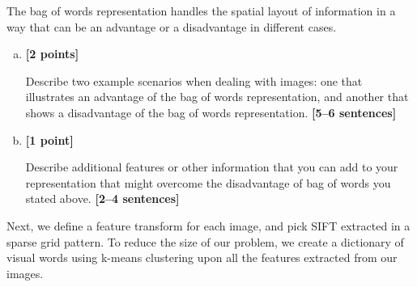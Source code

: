 The bag of words representation handles the spatial layout of information in a way that can be an advantage or a disadvantage in different cases.

\begin{enumerate}[(a)]

\item \textbf{[2 points]} 
\begin{tcolorbox}[colback=orange!5!white,colframe=orange!75!black]
     Describe two example scenarios when dealing with images: one that illustrates an advantage of the bag of words representation, and another that shows a disadvantage of the bag of words representation. \textbf{[5--6 sentences]}
\end{tcolorbox}


\item \textbf{[1 point]}
\begin{tcolorbox}[colback=orange!5!white,colframe=orange!75!black]
      Describe additional features or other information that you can add to your representation that might overcome the disadvantage of bag of words you stated above. \textbf{[2--4 sentences]}
\end{tcolorbox}


\end{enumerate}

\pagebreak
Next, we define a feature transform for each image, and pick SIFT extracted in a sparse grid pattern. To reduce the size of our problem, we create a dictionary of visual words using k-means clustering upon all the features extracted from our images.

